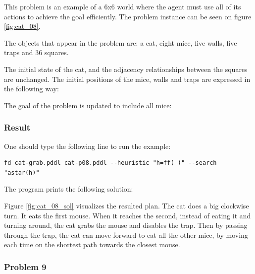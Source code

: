 This problem is an example of a 6x6 world where the agent must use all of its actions to achieve the goal efficiently. The problem instance can be seen on figure \ref{fig:cat_08}. 

The objects that appear in the problem are: a cat, eight mice, five walls, five traps and 36 squares.



The initial state of the cat, and the adjacency relationships between the squares are unchanged. The initial positions of the mice, walls and traps are expressed in the following way:

 

 
The goal of the problem is updated to include all mice:




\subsubsection{Result}

One should type the following line to run the example: 

\begin{lstlisting}[numbers=none]
fd cat-grab.pddl cat-p08.pddl --heuristic "h=ff( )" --search "astar(h)"
\end{lstlisting}

The program prints the following solution:



Figure \ref{fig:cat_08_sol} visualizes the resulted plan. The cat does a big clockwise turn. It eats the first mouse. When it reaches the second, instead of eating it and turning around, the cat grabs the mouse and disables the trap. Then by passing through the trap, the cat can move forward to eat all the other mice, by moving each time on the shortest path towards the closest mouse. 



\subsubsection{Problem 9}

